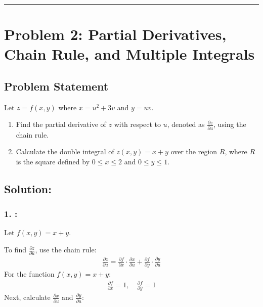 \documentclass[letterpaper,10pt,english]{jupyterBook}
\begin{document}
\bigskip\hrule\bigskip



\section{Problem 2: Partial Derivatives, Chain Rule, and Multiple Integrals}
\label{\detokenize{prerequisites:problem-2-partial-derivatives-chain-rule-and-multiple-integrals}}

\subsection{Problem Statement}
\label{\detokenize{prerequisites:id1}}
\sphinxAtStartPar
Let \(z = f(x, y)\) where \(x = u^2 + 3v\) and \(y = uv\).
\begin{enumerate}
%
\item {} 
\sphinxAtStartPar
Find the partial derivative of \(z\) with respect to \(u\), denoted as \(\frac{\partial z}{\partial u}\), using the chain rule.

\item {} 
\sphinxAtStartPar
Calculate the double integral of \(z(x, y) = x + y\) over the region \(R\), where \(R\) is the square defined by \(0 \leq x \leq 2\) and \(0 \leq y \leq 1\).

\end{enumerate}


\subsection{Solution:}
\label{\detokenize{prerequisites:id2}}

\subsubsection{1. :}
\label{\detokenize{prerequisites:applying-the-chain-rule}}
\sphinxAtStartPar
Let \(f(x, y) = x + y\).

\sphinxAtStartPar
To find \(\frac{\partial z}{\partial u}\), use the chain rule:
\begin{equation*}
\begin{split}
\frac{\partial z}{\partial u} = \frac{\partial f}{\partial x} \cdot \frac{\partial x}{\partial u} + \frac{\partial f}{\partial y} \cdot \frac{\partial y}{\partial u}
\end{split}
\end{equation*}
\sphinxAtStartPar
For the function \(f(x, y) = x + y\):
\begin{equation*}
\begin{split}
\frac{\partial f}{\partial x} = 1, \quad \frac{\partial f}{\partial y} = 1
\end{split}
\end{equation*}
\sphinxAtStartPar
Next, calculate \(\frac{\partial x}{\partial u}\) and \(\frac{\partial y}{\partial u}\):
\end{document}
